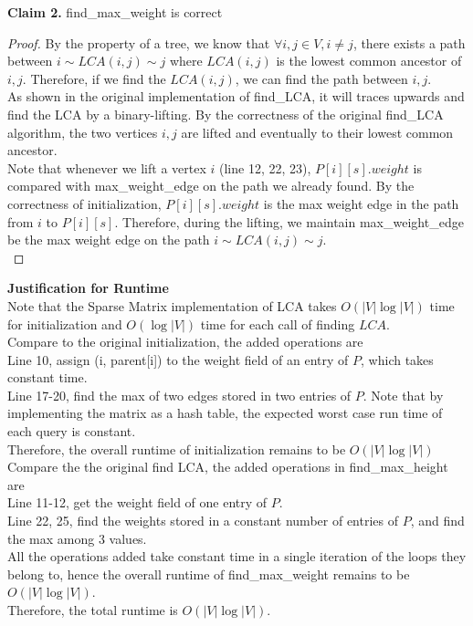 \documentclass[11pt]{article}
\begin{document}
\textbf{Claim 2. } find\_max\_weight is correct
\begin{proof}
By the property of a tree, we know that $\forall i,j\in V, i\neq j$, there exists a path between $i\sim LCA(i,j)\sim j$ where $LCA(i,j)$ is the lowest common ancestor of $i, j$.  Therefore, if we find the $LCA(i,j)$, we can find the path between $i,j$.\\
As shown in the original implementation of find\_LCA, it will traces upwards and find the LCA by a binary-lifting. By the correctness of the original find\_LCA algorithm, the two vertices $i,j$ are lifted and eventually to their lowest common ancestor.\\
Note that whenever we lift a vertex $i$ (line 12, 22, 23), $P[i][s].weight$ is compared with max\_weight\_edge on the path we already found. By the correctness of initialization, $P[i][s].weight$ is the max weight edge in the path from $i$ to $P[i][s]$. Therefore, during the lifting, we maintain max\_weight\_edge be the max weight edge on the path $i\sim LCA(i,j)\sim j$. \\[2ex]
\end{proof}


\textbf{Justification for Runtime} \\
Note that the Sparse Matrix implementation of LCA takes $O(|V|\log|V|)$ time for initialization and $O(\log|V|)$ time for each call of finding $LCA$. \\
Compare to the original initialization, the added operations are \\
Line 10, assign (i, parent[i]) to the weight field of an entry of $P$, which takes constant time. \\
Line 17-20, find the max of two edges stored in two entries of $P$. Note that by implementing the matrix as a hash table, the expected worst case run time of each query is constant.\\ 
Therefore, the overall runtime of initialization remains to be $O(|V|\log|V|)$ \\[2ex]
Compare the the original find LCA, the added operations in find\_max\_height are \\
Line 11-12, get the weight field of one entry of $P$.\\
Line 22, 25, find the weights stored in a constant number of entries of $P$, and find the max among 3 values. \\
All the operations added take constant time in a single iteration of the loops they belong to, hence the overall runtime of find\_max\_weight remains to be $O(|V|\log|V|)$. \\
Therefore, the total runtime is $O(|V|\log|V|)$.
\end{document}
